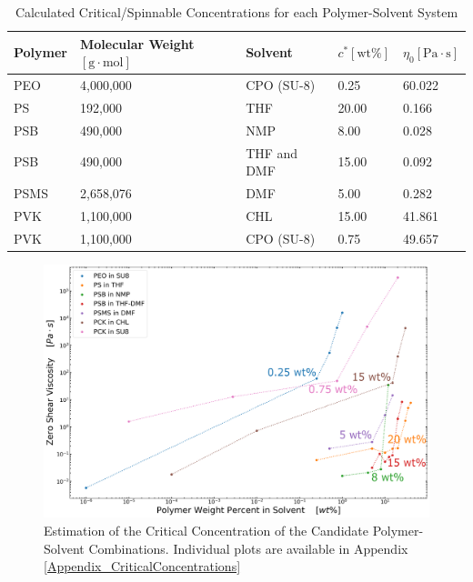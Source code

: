 \begin{table}[!th]
\centering
\caption[Calculated Critical/Spinnable Concentrations for each Polymer-Solvent System]{Calculated Critical/Spinnable Concentrations for each Polymer-Solvent System}
\begin{tabular}{lllll}
\hline
\textbf{Polymer} & \textbf{Molecular Weight $[\textrm{g} \cdot \textrm{mol}]$} & \textbf{Solvent} & \textbf{$c^* [\textrm{wt}\%]$} & \textbf{$\eta_0 [\textrm{Pa} \cdot \textrm{s}]$} \\
\hline
PEO  & 4,000,000                  & CPO (SU-8)  & 0.25  & 60.022 \\
PS   & 192,000                    & THF         & 20.00 & 0.166  \\
PSB  & 490,000   \cite{Doan2013}  & NMP         & 8.00  & 0.028  \\
PSB  & 490,000   \cite{Doan2013}  & THF and DMF & 15.00 & 0.092  \\
PSMS & 2,658,076 \cite{Colby1987} & DMF         & 5.00  & 0.282  \\
PVK  & 1,100,000                  & CHL         & 15.00 & 41.861 \\
PVK  & 1,100,000                  & CPO (SU-8)  & 0.75  & 49.657 \\
\hline
\end{tabular}
\label{tab:calculatedSpinnableConcentrations}
\end{table}

\begin{figure}[!th]
\centering
\includegraphics[width=\textwidth]{./Figures/ALLcriticalConcentrationCalculation.png}
\decoRule
\caption[Estimation of the Critical Concentration of the Candidate Polymer-Solvent Combinations]{Estimation of the Critical Concentration of the Candidate Polymer-Solvent Combinations. Individual plots are available in Appendix \ref{Appendix_CriticalConcentrations}}
\label{fig:ALLcriticalConcentrationCalculation}
\end{figure}

